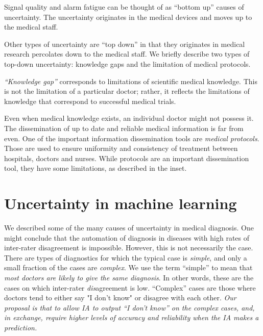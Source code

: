 \documentclass[11pt]{pnas-new}
\begin{document}
Signal quality and alarm fatigue can be thought of as ``bottom up''
causes of uncertainty. The uncertainty originates in the medical
devices and moves up to the medical staff.


Other types of uncertainty are ``top down'' in that they originates in medical research percolates down to the medical staff. We briefly
describe two types of top-down uncertainty: knowledge gaps and the
limitation of medical protocols.

{\em ``Knowledge gap''} corresponds to limitations of scientific medical
knowledge. This is not the limitation of a particular doctor; rather,
it reflects the limitations of knowledge that correspond to successful
medical trials.


Even when medical knowledge exists, an individual doctor might not
possess it. The dissemination of up to date and reliable medical
information is far from even. One of the important information
dissemination tools are {\em medical protocols}. Those are used to
ensure uniformity and consistency of treatment between hospitals,
doctors and nurses. While protocols are an important dissemination
tool, they have some limitations, as described in the inset.
~\\

\section{Uncertainty in machine learning}

We described some of the many causes of uncertainty in medical
diagnosis. One might conclude that the automation of diagnosis in
diseases with high rates of inter-rater disagreement is
impossible. However, this is not necessarily the case. There are types
of diagnostics for which the typical case is {\em simple}, and only a
small fraction of the cases are {\em complex}.  We use the term
``simple'' to mean that {\em most doctors are likely to give the same
  diagnosis}.  In other words, these are the cases on which
inter-rater {\em dis}agreement is low. ``Complex'' cases are those where
doctors tend to either say "I don't know" or disagree with each other.
{\em Our proposal is that to allow IA to output ``I don't know'' on
  the complex cases, and, in exchange, require higher levels of
  accuracy and reliability when the IA makes a prediction.}
\end{document}

